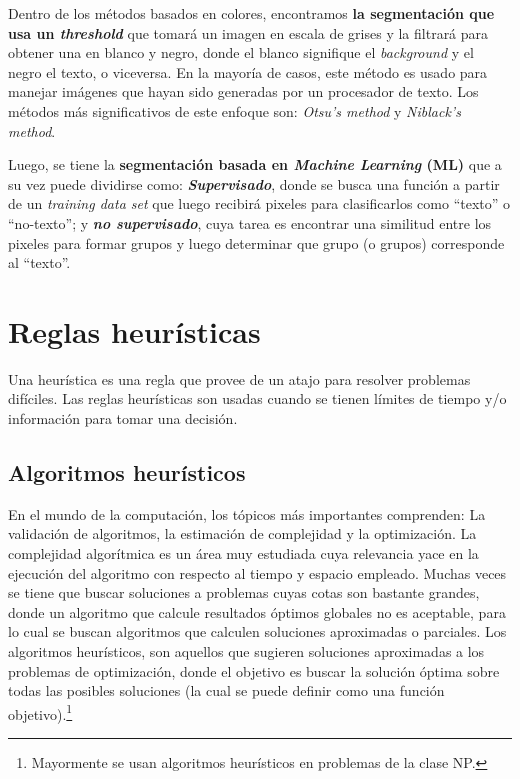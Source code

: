 Dentro de los métodos basados en colores, encontramos \textbf{la segmentación
que usa un \textit{threshold}} que tomará un imagen en escala de grises y la
filtrará  para obtener una en blanco y negro, donde el blanco signifique el
\textit{background} y el negro el texto, o viceversa. En la mayoría de casos, 
este método es usado para manejar imágenes que hayan sido generadas por un 
procesador de texto. Los métodos más significativos de este enfoque son: 
\textit{Otsu's method} y \textit{Niblack's method}.\cite{Sezgin:2004:Survey}

Luego, se tiene la \textbf{segmentación basada en \textit{Machine Learning} 
(ML)} que a su vez puede dividirse como: \textbf{\textit{Supervisado}}, donde 
se busca una función a partir de un \textit{training data set} que luego 
recibirá pixeles para clasificarlos como ``texto'' o ``no-texto''; y
\textbf{\textit{no supervisado}}, cuya tarea es encontrar una similitud entre
los pixeles para formar grupos y luego determinar que grupo (o grupos) 
corresponde al ``texto''.

\section{Reglas heurísticas}
Una heurística es una regla que provee de un atajo para resolver problemas 
difíciles. Las reglas heurísticas son usadas cuando se tienen límites de
tiempo y/o información para tomar una decisión.
\subsection{Algoritmos heurísticos}
  En el mundo de la computación, los tópicos más importantes comprenden: La 
  validación de algoritmos, la estimación de complejidad y la optimización. La
  complejidad algorítmica es un área muy estudiada cuya relevancia yace en la 
  ejecución del algoritmo con respecto al tiempo y espacio empleado. Muchas 
  veces se tiene que buscar soluciones a problemas cuyas cotas son bastante 
  grandes, donde un algoritmo que calcule resultados óptimos globales no es 
  aceptable, para lo cual se buscan algoritmos que calculen soluciones 
  aproximadas o parciales. Los algoritmos heurísticos, son aquellos que 
  sugieren soluciones aproximadas a los problemas de optimización, donde el
  objetivo es buscar la solución óptima sobre todas las posibles soluciones 
  (la cual se puede definir como una función objetivo).\footnote{Mayormente se
  usan algoritmos heurísticos en problemas de la clase NP.}
